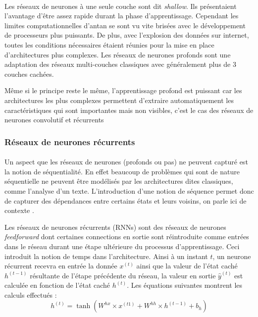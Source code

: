 		\paragraph{}
		Les réseaux de neurones à une seule couche sont dit \textit{shallow}. Ils présentaient l'avantage d'être assez rapide durant la phase d'apprentissage. Cependant les limites computationnelles d'antan se sont vu vite brisées avec le développement de processeurs plus puissants. De plus, avec l'explosion des données sur internet, toutes les conditions nécessaires étaient réunies pour la mise en place d'architectures plus complexes. Les réseaux de neurones profonds sont une adaptation des réseaux multi-couches classiques avec généralement plus de 3 couches cachées. 
		\par 
		Même si le principe reste le même, l'apprentissage profond est puissant car les architectures les plus complexes permettent d'extraire automatiquement les caractéristiques qui sont importantes mais non visibles, c'est le cas des réseaux de neurones convolutif et récurrents \cite{dnn} 
		
		\subsubsection{Réseaux de neurones récurrents}\label{seq2seqpart2}
		\paragraph{}
		Un aspect que les réseaux de neurones (profonds ou pas) ne peuvent capturé est la notion de séquentialité. En effet beaucoup de problèmes qui sont de nature séquentielle ne peuvent être modélisés par les architectures dites classiques, comme l'analyse d'un texte. L'introduction d'une notion de séquence permet donc de capturer des dépendances entre certains états et leurs voisins, on parle ici de contexte \cite{rnn_lstms}.
		\par 
		Les réseaux de neurones récurrents (RNNs) sont des réseaux de neurones \textit{feedforward} dont certaines connections en sortie sont réintroduite comme entrées dans le réseau durant une étape ultérieure du processus d'apprentissage. Ceci introduit la notion de temps dans l'architecture. Ainsi à un instant $t$, un neurone récurrent recevra en entrée la donnée $x^{(t)}$ ainsi que la valeur de l'état caché $h^{(t-1)}$ résultante de l'étape précédente du réseau, la valeur en sortie $\hat{y}^{(t)}$ est calculée en fonction de l'état caché $h^{(t)}$. Les équations suivantes montrent les calculs effectués \cite{rnn_lstmss} :
		\begin{equation}
			h^{(t)} = \tanh(W^{hx} \times x^{(t1)} + W^{hh} \times h^{(t-1)} + b_h)
		\end{equation}
		
